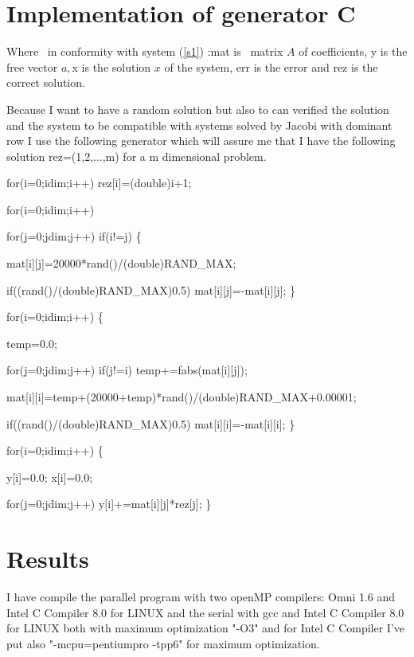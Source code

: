 \documentclass[a4paper]{article}
\begin{document}
\section{Implementation of generator C}

Where \ in conformity with system (\ref{s1}) :mat is \ matrix $A$ of
coefficients, y is the free vector $a,$x is the solution $x$ of the system,
err is the error and rez is the correct solution.

Because I want to have a random solution but also to can verified the
solution and the system to be compatible with systems solved by Jacobi with
dominant row I use the following generator which will assure me that I have
the following solution rez=(1,2,...,m) for a m dimensional problem.

{\small \qquad for(i=0;i\TEXTsymbol{<}dim;i++) rez[i]=(double)i+1;}

{\small \qquad for(i=0;i\TEXTsymbol{<}dim;i++)}

{\small \qquad \qquad for(j=0;j\TEXTsymbol{<}dim;j++) if(i!=j) \{}

{\small \qquad \qquad \qquad \qquad mat[i][j]=20000*rand()/(double)RAND\_MAX;%
}

{\small \qquad \qquad \qquad \qquad if((rand()/(double)RAND\_MAX)\TEXTsymbol{%
<}0.5) mat[i][j]=-mat[i][j]; \}}

{\small \qquad for(i=0;i\TEXTsymbol{<}dim;i++) \{}

{\small \qquad \qquad temp=0.0;}

{\small \qquad \qquad for(j=0;j\TEXTsymbol{<}dim;j++) if(j!=i)
temp+=fabs(mat[i][j]);}

{\small \qquad \qquad
mat[i][i]=temp+(20000+temp)*rand()/(double)RAND\_MAX+0.00001;}

{\small \qquad \qquad if((rand()/(double)RAND\_MAX)\TEXTsymbol{<}0.5)
mat[i][i]=-mat[i][i]; \}}

{\small \qquad for(i=0;i\TEXTsymbol{<}dim;i++) \{}

{\small \qquad \qquad y[i]=0.0; x[i]=0.0;}

{\small \qquad \qquad for(j=0;j\TEXTsymbol{<}dim;j++)
y[i]+=mat[i][j]*rez[j]; \}}

\section{Results}

I have compile the parallel program with two openMP compilers: Omni 1.6 and
Intel C Compiler 8.0 for LINUX and the serial with gcc and Intel C Compiler
8.0 for LINUX both with maximum optimization "-O3" and for Intel C Compiler
I've put also "-mcpu=pentiumpro -tpp6" for maximum optimization.
\end{document}
